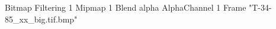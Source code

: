 {Bitmap
	{Filtering 1}
	{Mipmap 1}
	{Blend alpha}
	{AlphaChannel 1}
	{Frame "T-34-85_xx_big.tif.bmp"}
}
